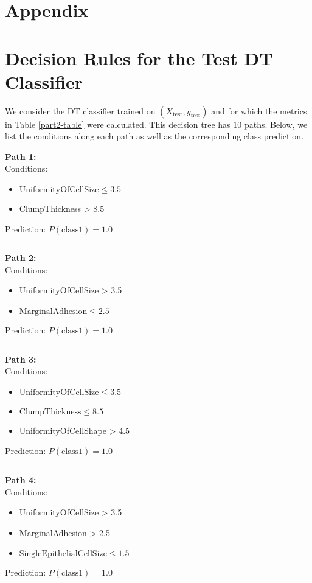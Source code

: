\documentclass[12pt]{article}
\newcommand{\Xtest}{X_{\mbox{test}}}
\newcommand{\ytest}{y_{\mbox{test}}}
\begin{document}
\section{Appendix}

\appendix
\renewcommand{\thesection}{A\arabic{section}.  }

\section{Decision Rules for the Test DT Classifier}

We consider the DT classifier trained on $(\Xtest, \ytest)$ and for which the metrics in Table \ref{part2-table} were calculated. This decision tree has $10$ paths. Below, we list the conditions along each path as well as the corresponding class prediction.

\textbf{Path 1:} \\
Conditions:
\begin{itemize}
\item $\mbox{UniformityOfCellSize} \leq 3.5$
\item \mbox{ClumpThickness} > 8.5
\end{itemize}
Prediction: $P(\mbox{class} 1) = 1.0$

\[\quad\]

\textbf{Path 2:} \\
Conditions:
\begin{itemize}
\item \mbox{UniformityOfCellSize} > 3.5
\item $\mbox{MarginalAdhesion} \leq 2.5$
\end{itemize}
Prediction: $P(\mbox{class} 1) = 1.0$

\[\quad\]

\textbf{Path 3:} \\
Conditions:
\begin{itemize}
\item $\mbox{UniformityOfCellSize} \leq 3.5$
\item $\mbox{ClumpThickness} \leq 8.5$
\item \mbox{UniformityOfCellShape} > 4.5
\end{itemize}
Prediction: $P(\mbox{class} 1) = 1.0$

\[\quad\]

\textbf{Path 4:} \\
Conditions:
\begin{itemize}
\item \mbox{UniformityOfCellSize} > 3.5
\item \mbox{MarginalAdhesion} > 2.5
\item $\mbox{SingleEpithelialCellSize} \leq 1.5$
\end{itemize}
Prediction: $P(\mbox{class} 1) = 1.0$
\end{document}
